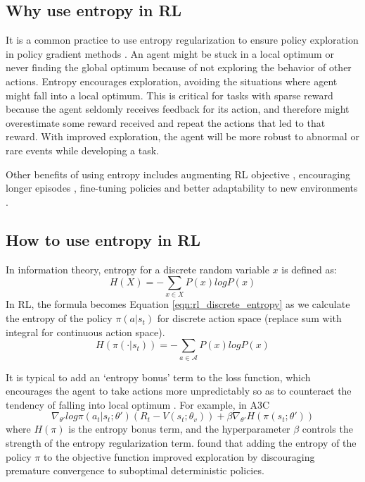 \documentclass[lang=en,mode=normal,device=normal,color=blue,12pt]{elegantnote}
\DeclareMathOperator*{\1}{\mathbbm{1}}
\begin{document}
\begin{appendices}
\subsection{Why use entropy in RL}

It is a common practice to use entropy regularization to ensure policy exploration in policy gradient methods \cite{odonoghue2017combining}.
An agent might be stuck in a local optimum or never finding the global optimum because of not exploring the behavior of other actions.
Entropy encourages exploration, avoiding the situations where agent might fall into a local optimum.
This is critical for tasks with sparse reward because the agent seldomly receives feedback for its action, and therefore might overestimate some reward received and repeat the actions that led to that reward. With improved exploration, the agent will be more robust to abnormal or rare events while developing a task.

Other benefits of using entropy includes augmenting RL objective \cite{brianEntropy2010}, encouraging longer episodes \cite{schulman2018equivalence}, fine-tuning policies and better adaptability to new environments \cite{haarnoja2017reinforcement}.



\subsection{How to use entropy in RL}

In information theory, entropy for a discrete random variable $x$ is defined as: 
\begin{equation}
\label{eqn:info_entropy}
H(X) = -\sum_{x\in X} P(x) logP(x)
\end{equation}
In RL, the formula becomes Equation \ref{eqn:rl_discrete_entropy} as we calculate the entropy of the policy $\pi(a|s_t)$ for discrete action space (replace sum with integral for continuous action space).
\begin{equation}
\label{eqn:rl_discrete_entropy}
H(\pi(\cdot|s_t)) = -\sum_{a\in \mathcal{A}} P(x) log P(x)
\end{equation}

It is typical to add an `entropy bonus' term to the loss function, which encourages the agent to take actions more unpredictably so as to counteract the tendency of falling into local optimum \cite{odonoghue2017combining}.
For example, in A3C \cite{mnih2016asynchronous}
\[
\nabla_{\theta'}log\pi (a_t | s_t; \theta')(R_t - V(s_t;\theta_v))+\beta\nabla_{\theta'}H(\pi(s_t;\theta'))
\]
where $H(\pi)$ is the entropy bonus term, and the hyperparameter $\beta$ controls the strength of the entropy regularization term. \cite{mnih2016asynchronous} found that adding the entropy of the policy $\pi$ to the objective function improved exploration by discouraging premature convergence to suboptimal deterministic policies.


\end{appendices}
\end{document}
